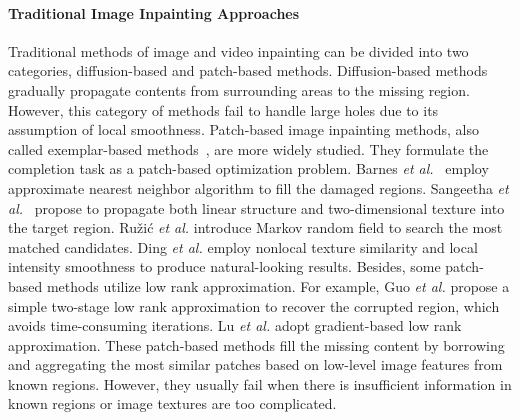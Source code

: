 \paragraph{Traditional Image Inpainting Approaches}
Traditional methods of image and video inpainting can be divided into two categories, diffusion-based and patch-based methods. 
Diffusion-based methods \cite{bertalmio2000image,ballester2001filling,sridevi2019image} gradually propagate contents from surrounding areas to the missing region. 
However, this category of methods fail to handle large holes due to its assumption of local smoothness. 
%
Patch-based image inpainting methods, also called exemplar-based methods~\cite{bertalmio2003simultaneous,efros2001image,li2008patch,zhang2014image}, are more widely studied.
They formulate the completion task as a patch-based optimization problem. 
Barnes \emph{et al.}~\cite{barnes2009patchmatch} employ approximate nearest neighbor algorithm to fill the damaged regions.
Sangeetha \emph{et al.}~\cite{sangeetha2011combined} propose to propagate both linear structure and two-dimensional texture into the target region.
Ru{\v{z}}i{\'c} \emph{et al.} \cite{ruvzic2014context} introduce Markov random field to search the most matched candidates.
Ding \emph{et al.} \cite{ding_19nonlocal} employ nonlocal texture similarity and local intensity smoothness to produce natural-looking results.
Besides, some patch-based methods utilize low rank approximation. For example, Guo \emph{et al.} \cite{pb_lowrank2018} propose a simple two-stage low rank approximation to recover the corrupted region, which avoids time-consuming iterations.
Lu \emph{et al.} \cite{lu2018gradient} adopt gradient-based low rank approximation.
These patch-based methods fill the missing content by borrowing and aggregating the most similar patches based on low-level image features from known regions. However, they usually fail when there is insufficient information in known regions or image textures are too complicated.  
%

